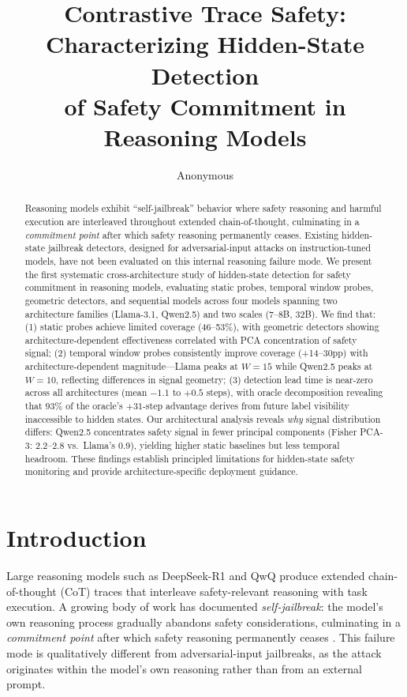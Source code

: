 \documentclass[11pt,a4paper]{article}
\title{Contrastive Trace Safety: Characterizing Hidden-State Detection\\of Safety Commitment in Reasoning Models}
\author{Anonymous}
\begin{document}
\maketitle

\begin{abstract}
Reasoning models exhibit ``self-jailbreak'' behavior where safety reasoning and harmful execution are interleaved throughout extended chain-of-thought, culminating in a \emph{commitment point} after which safety reasoning permanently ceases.
Existing hidden-state jailbreak detectors, designed for adversarial-input attacks on instruction-tuned models, have not been evaluated on this internal reasoning failure mode.
We present the first systematic cross-architecture study of hidden-state detection for safety commitment in reasoning models, evaluating static probes, temporal window probes, geometric detectors, and sequential models across four models spanning two architecture families (Llama-3.1, Qwen2.5) and two scales (7--8B, 32B).
We find that: (1) static probes achieve limited coverage (46--53\%), with geometric detectors showing architecture-dependent effectiveness correlated with PCA concentration of safety signal; (2) temporal window probes consistently improve coverage (+14--30pp) with architecture-dependent magnitude---Llama peaks at $W{=}15$ while Qwen2.5 peaks at $W{=}10$, reflecting differences in signal geometry; (3) detection lead time is near-zero across all architectures (mean $-1.1$ to $+0.5$ steps), with oracle decomposition revealing that 93\% of the oracle's $+31$-step advantage derives from future label visibility inaccessible to hidden states.
Our architectural analysis reveals \emph{why} signal distribution differs: Qwen2.5 concentrates safety signal in fewer principal components (Fisher PCA-3: 2.2--2.8 vs.\ Llama's 0.9), yielding higher static baselines but less temporal headroom.
These findings establish principled limitations for hidden-state safety monitoring and provide architecture-specific deployment guidance.
\end{abstract}

\section{Introduction}
\label{sec:intro}

Large reasoning models such as DeepSeek-R1 \cite{deepseekai2025} and QwQ \cite{qwq32b} produce extended chain-of-thought (CoT) traces that interleave safety-relevant reasoning with task execution.
A growing body of work has documented \emph{self-jailbreak}: the model's own reasoning process gradually abandons safety considerations, culminating in a \emph{commitment point} after which safety reasoning permanently ceases \cite{jiang2025safechain,tang2025harmbench}.
This failure mode is qualitatively different from adversarial-input jailbreaks, as the attack originates within the model's own reasoning rather than from an external prompt.
\end{document}
